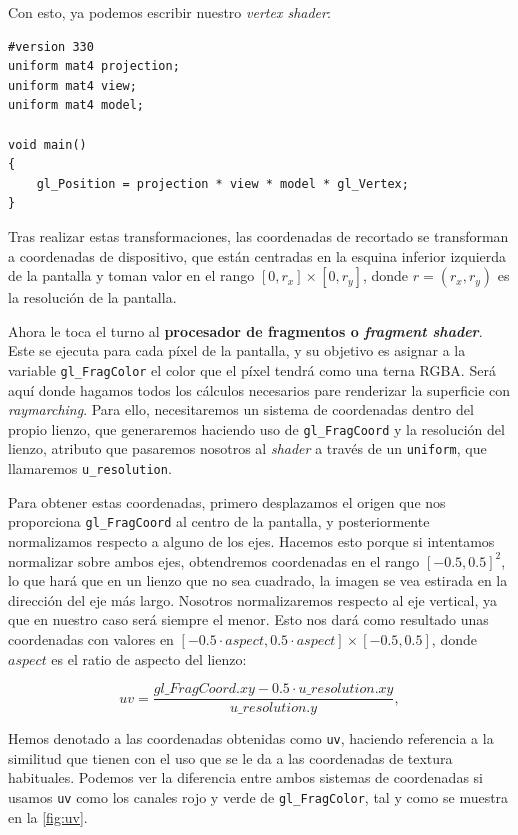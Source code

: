 Con esto, ya podemos escribir nuestro \textit{vertex shader}:
\begin{lstlisting}[title=Procesador de vértices]
#version 330    
uniform mat4 projection;
uniform mat4 view;
uniform mat4 model;

void main()
{
    gl_Position = projection * view * model * gl_Vertex;
}
\end{lstlisting}

Tras realizar estas transformaciones, las coordenadas de recortado se transforman a coordenadas de dispositivo, que están centradas en la esquina inferior izquierda de la pantalla y toman valor en el rango $[0,r_x]\times [0,r_y]$, donde $r=(r_x,r_y)$ es la resolución de la pantalla.\newline

Ahora le toca el turno al \textbf{procesador de fragmentos o \textit{fragment shader}}. Este se ejecuta para cada píxel de la pantalla, y su objetivo es asignar a la variable \texttt{gl\_FragColor} el color que el píxel tendrá como una terna RGBA. Será aquí donde hagamos todos los cálculos necesarios pare renderizar la superficie con \textit{raymarching}. Para ello, necesitaremos un sistema de coordenadas dentro del propio lienzo, que generaremos haciendo uso de \texttt{gl\_FragCoord} y la resolución del lienzo, atributo que pasaremos nosotros al \textit{shader} a través de un \texttt{uniform}, que llamaremos \texttt{u\_resolution}.

Para obtener estas coordenadas, primero desplazamos el origen que nos proporciona \texttt{gl\_FragCoord} al centro de la pantalla, y posteriormente normalizamos respecto a alguno de los ejes. Hacemos esto porque si intentamos normalizar sobre ambos ejes, obtendremos coordenadas en el rango $[-0.5,0.5]^2$, lo que hará que en un lienzo que no sea cuadrado, la imagen se vea estirada en la dirección del eje más largo. Nosotros normalizaremos respecto al eje vertical, ya que en nuestro caso será siempre el menor. Esto nos dará como resultado unas coordenadas con valores en $\left[ -0.5\cdot aspect, 0.5\cdot aspect \right] \times [-0.5, 0.5]$, donde $aspect$ es el ratio de aspecto del lienzo:

\begin{equation*}
    uv = \frac{gl\_FragCoord.xy - 0.5\cdot u\_resolution.xy}{u\_resolution.y} ,
\end{equation*}

Hemos denotado a las coordenadas obtenidas como \texttt{uv}, haciendo referencia a la similitud que tienen con el uso que se le da a las coordenadas de textura habituales. Podemos ver la diferencia entre ambos sistemas de coordenadas si usamos \texttt{uv} como los canales rojo y verde de \texttt{gl\_FragColor}, tal y como se muestra en la \autoref{fig:uv}.\newline

